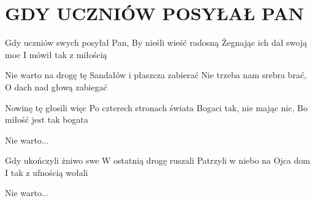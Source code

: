 \documentclass[../../../songbook.tex]{subfiles}
\begin{document}
\TabPositions{8cm} %
\section*{GDY UCZNIÓW POSYŁAŁ PAN}
{}
\vspace{0.5cm}
Gdy uczniów swych posyłał Pan,	 \newline	 	
By nieśli wieść radosną			 \newline	
Żegnając ich dał swoją moc		 \newline	
I mówił tak z miłością			 \newline	

\-\hspace{1cm} Nie warto na drogę tę			 \newline	
\-\hspace{1cm} Sandałów i płaszcza zabierać	 \newline	
\-\hspace{1cm} Nie trzeba nam srebra brać, \newline	
\-\hspace{1cm} O dach nad głową zabiegać \newline	

Nowinę tę głosili więc \newline	
Po czterech stronach świata \newline	
Bogaci tak, nie mając nic, \newline	
Bo miłość jest tak bogata \newline	

\-\hspace{1cm} Nie warto...  \newline	

Gdy ukończyli żniwo swe \newline	
W ostatnią drogę ruszali \newline	
Patrzyli w niebo na Ojca dom \newline	
I tak z ufnością wołali \newline	

\-\hspace{1cm} Nie warto... 
\end{document}
